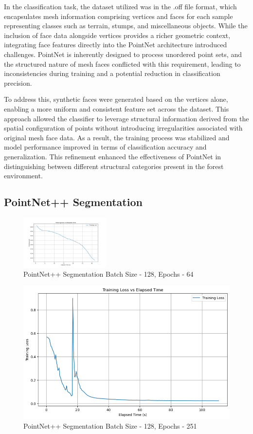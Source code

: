 \documentclass[../report.tex]{subfiles}
\begin{document}
    In the classification task, the dataset utilized was in the .off file format, which encapsulates mesh information comprising vertices and faces for each sample representing classes such as terrain, stumps, and miscellaneous objects. While the inclusion of face data alongside vertices provides a richer geometric context, integrating face features directly into the PointNet architecture introduced challenges. PointNet is inherently designed to process unordered point sets, and the structured nature of mesh faces conflicted with this requirement, leading to inconsistencies during training and a potential reduction in classification precision.\cite{pointnetclass}
    
    To address this, synthetic faces were generated based on the vertices alone, enabling a more uniform and consistent feature set across the dataset. This approach allowed the classifier to leverage structural information derived from the spatial configuration of points without introducing irregularities associated with original mesh face data. As a result, the training process was stabilized and model performance improved in terms of classification accuracy and generalization. This refinement enhanced the effectiveness of PointNet in distinguishing between different structural categories present in the forest environment.
    
\subsection{PointNet++ Segmentation}

\begin{figure}
    \centering
    \includegraphics[width=0.4\textwidth]{rnd-project-report-main/figures/PointNetSeg_output.png}
    \caption{PointNet++ Segmentation Batch Size - 128, Epochs - 64}
\end{figure}


\begin{figure}
    \centering
    \includegraphics[width=0.7\linewidth]{rnd-project-report-main/figures/PointNetSeg_bs128_ep251.png}
    \caption{PointNet++ Segmentation Batch Size - 128, Epochs - 251}
    \label{fig:pointnetseg_bs128_ep251}
\end{figure}
\end{document}
